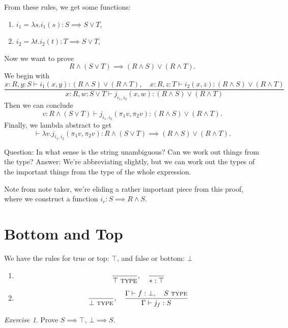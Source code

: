 \documentclass{article}
\newcommand{\yields}{\vdash}
\newcommand\TYPE{\text{ \scshape{type}}}
\theoremstyle{remark}
\newtheorem{exercise}{Exercise}
\begin{document}
\begin{example}
    From these rules, we get some functions:
    \begin{enumerate}
        \item $i_1=\lambda s.i_1(s) : S\implies S\vee T$,
        \item $i_2=\lambda t.i_2(t) : T\implies S\vee T$,
    \end{enumerate}

    Now we want to prove 
    \[R\wedge (S\vee T) \implies (R\wedge S)\vee (R\wedge T).\]
    We begin with 
    \[
    \frac{
        x:R,y:S\yields i_1(x,y) :(R\wedge S)\vee (R\wedge T),
        \quad 
        x:R,z:T\yields i_2(x,z) : (R\wedge S)\vee (R\wedge T)
    }{
        x:R,w:S\vee T \yields j_{i_1,i_2}(x,w) : 
        (R\wedge S) \vee (R\wedge T)
    }
    \]
    Then we can conclude 
    \[ 
        v:R\wedge (S\vee T) \yields j_{i_1,i_2}(\pi_1v,\pi_2v):
        (R\wedge S) \vee (R\wedge T).
    \]
    Finally, we lambda abstract to get
    \[
        \yields 
        \lambda v.j_{i_1,i_2}(\pi_1v,\pi_2v):
        R\wedge (S\vee T)\implies (R\wedge S) \vee (R\wedge T).
    \]

    Question: In what sense is the string unambiguous? Can 
    we work out things from the type?
    Answer: We're abbreviating slightly, but we can work 
    out the types of the important things from the type 
    of the whole expression.

    Note from note taker, we're eliding a rather important 
    piece from this proof, where we construct a function
    $i_r:S\implies R\wedge S$.
\end{example}

\section{Bottom and Top}
\begin{definition}
    We have the rules for true or top: $\top$,
    and false or bottom: $\bot$
    \begin{enumerate}
        \item \[ \frac{}{\top\TYPE}, \quad
        \frac{}{* : \top}\]
        \item \[\frac{}{\bot\TYPE},\quad
        \frac{\Gamma \yields f:\bot,\quad 
        S\TYPE}{
            \Gamma \yields j_f:S
        }\]
    \end{enumerate}
\end{definition}

\begin{exercise}
    Prove $S\implies \top$, $\bot \implies S$.
\end{exercise}
\end{document}
